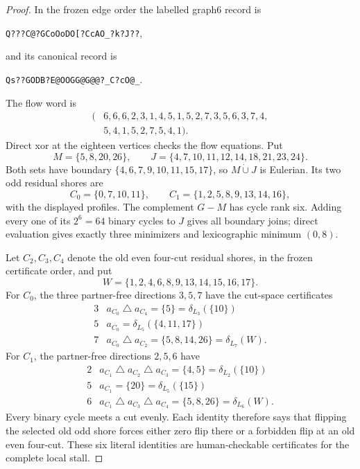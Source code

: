\documentclass[11pt]{article}
\theoremstyle{definition}
\theoremstyle{remark}
\newcommand{\symdiff}{\mathbin{\triangle}}
\numberwithin{equation}{section}
\begin{document}
\begin{proof}
In the frozen edge order the labelled graph6 record is
\begin{center}
\nolinkurl{Q???C@?GCoOoDO[?CcAO_?k?J??},
\end{center}
and its canonical record is
\begin{center}
\nolinkurl{Qs??GODB?E@OOGG@G@@?_C?cO@_}.
\end{center}
The flow word is
\[
\begin{split}
(&6,6,6,2,3,1,4,5,1,5,2,7,3,5,6,3,7,4,\\
 &5,4,1,5,2,7,5,4,1).
\end{split}
\]
Direct xor at the eighteen vertices checks the flow equations.  Put
\[
 M=\{5,8,20,26\},\qquad
 J=\{4,7,10,11,12,14,18,21,23,24\}.
\]
Both sets have boundary
\(\{4,6,7,9,10,11,15,17\}\), so
\(M\mathbin{\dot\cup}J\) is Eulerian.  Its two odd residual shores are
\[
 C_0=\{0,7,10,11\},\qquad
 C_1=\{1,2,5,8,9,13,14,16\},
\]
with the displayed profiles.  The complement \(G-M\) has cycle rank six.
Adding every one of its \(2^6=64\) binary cycles to \(J\) gives all
boundary joins; direct evaluation gives exactly three minimizers and
lexicographic minimum \((0,8)\).

Let \(C_2,C_3,C_4\) denote the old even four-cut residual shores, in the
frozen certificate order, and put
\[
 W=\{1,2,4,6,8,9,13,14,15,16,17\}.
\]
For \(C_0\), the three partner-free directions \(3,5,7\) have the cut-space
certificates
\[
\begin{array}{c|l}
3&a_{C_0}\symdiff a_{C_4}=\{5\}=\delta_{L_3}(\{10\})\\
5&a_{C_0}=\delta_{L_5}(\{4,11,17\})\\
7&a_{C_0}\symdiff a_{C_2}=\{5,8,14,26\}=\delta_{L_7}(W).
\end{array}
\]
For \(C_1\), the partner-free directions \(2,5,6\) have
\[
\begin{array}{c|l}
2&a_{C_1}\symdiff a_{C_2}\symdiff a_{C_3}
   =\{4,5\}=\delta_{L_2}(\{10\})\\
5&a_{C_1}=\{20\}=\delta_{L_5}(\{15\})\\
6&a_{C_1}\symdiff a_{C_3}\symdiff a_{C_4}
   =\{5,8,26\}=\delta_{L_6}(W).
\end{array}
\]
Every binary cycle meets a cut evenly.  Each identity therefore says
that flipping the selected old odd shore forces either zero flip there or
a forbidden flip at an old even four-cut.  These six literal identities
are human-checkable certificates for the complete local stall.


\end{proof}
\end{document}
